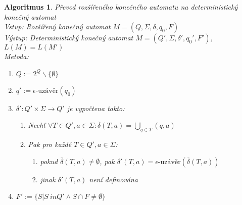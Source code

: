 \documentclass[a4paper, 11pt]{report}
\newtheorem{alg}{Algoritmus}[chapter]
\begin{document}
\begin{alg}
Převod rozšířeného konečného automatu na deterministický konečný automat\\
Vstup: Rozšířený konečný automat $M = (Q, \Sigma, \delta, q_0, F)$\\
Výstup: Deterministický konečný automat $M = (Q', \Sigma, \delta', q_0', F')$, $L(M) = L(M')$\\
Metoda:
\begin{enumerate}
	\item $Q := 2^Q \backslash \{\emptyset\}$
	\item $q' := \epsilon\text{-uzávěr}(q_0)$
	\item $\delta': Q' \times \Sigma \to Q'$ je vypočtena takto:
	\begin{enumerate}
		\item Nechť $\forall T \in Q', a \in \Sigma: \overline{\delta}(T, a) = \bigcup_{q \in T}(q, a)$
		\item Pak pro každé $T \in Q', a \in \Sigma$:
		\begin{enumerate}
			\item pokud $\overline{\delta}(T, a) \not= \emptyset$, pak $\delta'(T, a) = \epsilon\text{-uzávěr}(\overline{\delta}(T, a))$
			\item jinak $\delta'(T, a)$ není definována
		\end{enumerate}
	\end{enumerate}
	\item $F' := \{S | S \ in Q' \land S \cap F \not= \emptyset\}$
\end{enumerate}
\end{alg}
\end{document}
